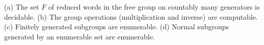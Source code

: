 (a) The set $F$ of reduced words in the free group on countably many generators is decidable.
(b) The group operations (multiplication and inverse) are computable.
(c) Finitely generated subgroups are enumerable.
(d) Normal subgroups generated by an enumerable set are enumerable.